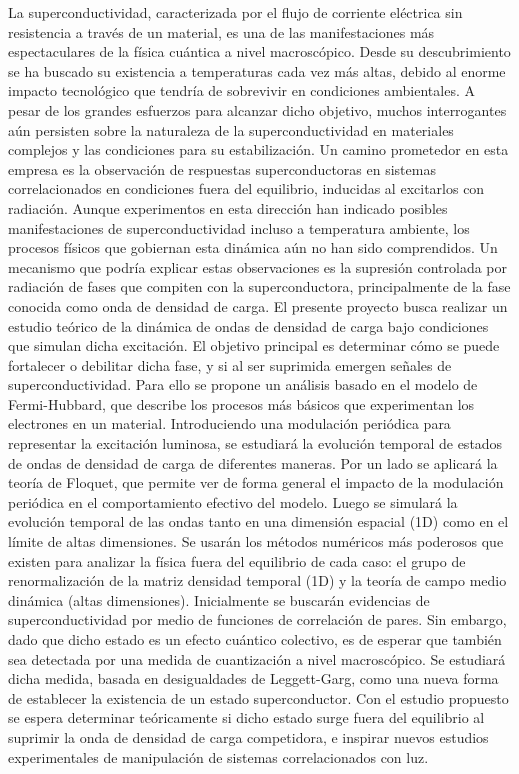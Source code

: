 \documentclass[a4paper,10pt]{article}
\begin{document}
La superconductividad, caracterizada por el flujo de corriente el\'ectrica sin resistencia a trav\'es de un material, es una de las manifestaciones m\'as espectaculares de la f\'isica cu\'antica a nivel macrosc\'opico. Desde su descubrimiento se ha buscado su existencia a temperaturas cada vez m\'as altas, debido al enorme impacto tecnol\'ogico que tendr\'ia de sobrevivir en condiciones ambientales. A pesar de los grandes esfuerzos para alcanzar dicho objetivo, muchos interrogantes a\'un persisten sobre la naturaleza de la superconductividad en materiales complejos y las condiciones para su estabilizaci\'on. Un camino prometedor en esta empresa es la observaci\'on de respuestas superconductoras en sistemas correlacionados en condiciones fuera del equilibrio, inducidas al excitarlos con radiaci\'on. Aunque experimentos en esta direcci\'on han indicado posibles manifestaciones de superconductividad incluso a temperatura ambiente, los procesos f\'isicos que gobiernan esta din\'amica a\'un no han sido comprendidos. Un mecanismo que podr\'ia explicar estas observaciones es la supresi\'on controlada por radiaci\'on de fases que compiten con la superconductora, principalmente de la fase conocida como onda de densidad de carga. El presente proyecto busca realizar un estudio te\'orico de la din\'amica de ondas de densidad de carga bajo condiciones que simulan dicha excitaci\'on. El objetivo principal es determinar c\'omo se puede fortalecer o debilitar dicha fase, y si al ser suprimida emergen se\~nales de superconductividad. Para ello se propone un an\'alisis basado en el modelo de Fermi-Hubbard, que describe los procesos m\'as b\'asicos que experimentan los electrones en un material. Introduciendo una modulaci\'on peri\'odica para representar la excitaci\'on luminosa, se estudiar\'a la evoluci\'on temporal de estados de ondas de densidad de carga de diferentes maneras. Por un lado se aplicar\'a la teor\'ia de Floquet, que permite ver de forma general el impacto de la modulaci\'on peri\'odica en el comportamiento efectivo del modelo. Luego se simular\'a la evoluci\'on temporal de las ondas tanto en una dimensi\'on espacial (1D) como en el l\'imite de altas dimensiones. Se usar\'an los m\'etodos num\'ericos m\'as poderosos que existen para analizar la f\'isica fuera del equilibrio de cada caso: el grupo de renormalizaci\'on de la matriz densidad temporal (1D) y la teor\'ia de campo medio din\'amica (altas dimensiones). Inicialmente se buscar\'an evidencias de superconductividad por medio de funciones de correlaci\'on de pares. Sin embargo, dado que dicho estado es un efecto cu\'antico colectivo, es de esperar que tambi\'en sea detectada por una medida de cuantizaci\'on a nivel macrosc\'opico. Se estudiar\'a dicha medida, basada en desigualdades de Leggett-Garg, como una nueva forma de establecer la existencia de un estado superconductor. Con el estudio propuesto se espera determinar te\'oricamente si dicho estado surge fuera del equilibrio al suprimir la onda de densidad de carga competidora, e inspirar nuevos estudios experimentales de manipulaci\'on de sistemas correlacionados con luz.
\end{document}
